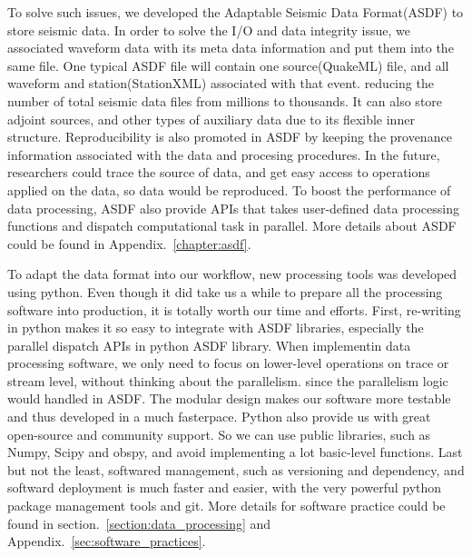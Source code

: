 To solve such issues, we developed the Adaptable
Seismic Data Format(ASDF) to store seismic data. 
In order to solve the I/O and data integrity issue, we associated
waveform data with its meta data information and put them into the same file.
One typical ASDF file will contain one
source(QuakeML) file, and all waveform and station(StationXML) associated with that event.
reducing the number of total seismic data files from millions to thousands.
It can also store adjoint sources, and other types of auxiliary data due to its
flexible inner structure.
Reproducibility is also promoted in ASDF by keeping the provenance information
associated with the data and procesing procedures.
In the future, researchers could trace the source of data, and get easy access
to operations applied on the data, so data would be reproduced.
To boost the performance of data processing, ASDF also provide APIs that takes
user-defined data processing functions and dispatch computational task in parallel.
More details about ASDF could be found in Appendix.~\ref{chapter:asdf}.

To adapt the data format into our workflow, new processing tools was developed using python.
Even though it did take us a while to prepare all the processing software
into production, it is totally worth our time and efforts.
First, re-writing in python
makes it so easy to integrate with ASDF libraries, especially the parallel dispatch APIs
in python ASDF library.
When implementin data processing software, we only need to focus on lower-level
operations on trace or stream level, without thinking about the parallelism.
since the parallelism logic would handled in ASDF.
The modular design makes our software more testable and thus developed in a much fasterpace.
Python also provide us with great open-source and community support.
So we can use public libraries, such as Numpy, Scipy and obspy, and avoid
implementing a lot basic-level functions.
Last but not the least, softwared management, such as versioning and dependency,
and softward deployment is much faster and easier,
with the very powerful python package management tools and git.
More details for software practice could be found in 
section.~\ref{section:data_processing} and Appendix.~\ref{sec:software_practices}.

